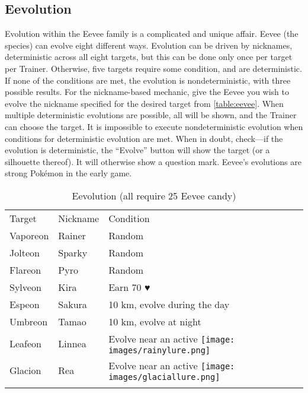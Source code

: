 \subsection{Eevolution}
\begin{figure}
\end{figure}
Evolution within the Eevee family is a complicated and unique affair.
Eevee (the species) can evolve eight different ways.
Evolution can be driven by nicknames, deterministic across all eight targets,
  but this can be done only once per target per Trainer.
Otherwise, five targets require some condition, and are deterministic.
If none of the conditions are met, the evolution is nondeterministic,
  with three possible results.
For the nickname-based mechanic, give the Eevee you wish to evolve the nickname
  specified for the desired target from \autoref{table:eevee}.
When multiple deterministic evolutions are possible, all will be shown,
  and the Trainer can choose the target.
It is impossible to execute nondeterministic evolution when conditions for deterministic evolution are met.
When in doubt, check---if the evolution is deterministic, the ``Evolve'' button will show the target (or a silhouette thereof).
It will otherwise show a question mark.
Eevee's evolutions are strong Pokémon in the early game.
\begin{table}
\footnotesize
\centering
\begin{tabular}{lll}
  Target & Nickname & Condition\\
  \Midrule
  Vaporeon & Rainer & Random\\
  Jolteon & Sparky & Random\\
  Flareon & Pyro & Random\\
  Sylveon & Kira & Earn 70 ♥ \\
  Espeon & Sakura & 10 km, evolve during the day\\
  Umbreon & Tamao & 10 km, evolve at night\\
  Leafeon & Linnea & Evolve near an active \texttt{[image: images/rainylure.png]} \\
  Glacion & Rea & Evolve near an active \texttt{[image: images/glaciallure.png]} \\\\
\end{tabular}
\caption{Eevolution (all require 25 Eevee candy)\label{table:eevee}}
\end{table}

